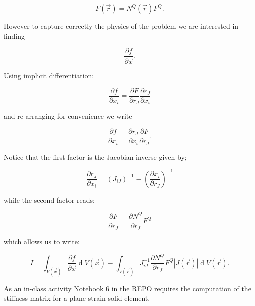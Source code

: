 \[F(\overrightarrow r)=N^Q(\overrightarrow r)F^Q.\]

However to capture correctly the physics of the problem we are interested in finding

\[\frac{\partial f}{\partial\overrightarrow x}.\]

Using implicit differentiation:

\[\frac{\partial f}{\partial x_i}=\frac{\partial F}{\partial r_J}\frac{\partial r_J}{\partial x_i}\]

and re-arranging for convenience we write

\begin{equation}
\frac{\partial f}{\partial x_i}=\frac{\displaystyle\partial r_J}{\displaystyle\partial x_i}\frac{\partial F}{\partial r_J}.
\end{equation}

Notice that the first factor is the Jacobian inverse given by;

\[\frac{\partial r_J}{\partial x_i}=\left(J_{iJ}\right)^{-1}\equiv\left(\frac{\displaystyle\partial x_i}{\displaystyle\partial r_J}\right)^{-1}\]

while the second factor reads:

\[\frac{\partial F}{\partial r_J}=\frac{\partial N^Q}{\partial r_J}F^Q\]

which allows us to write:

\[I=\int_{V(\overrightarrow x)}\frac{\partial f}{\partial\overrightarrow x}\operatorname d{V(\overrightarrow x)}\equiv\int_{V(\overrightarrow r)}J_{iJ}^{-1}\frac{\displaystyle\partial N^Q}{\displaystyle\partial r_J} F^Q \left|J(\overrightarrow r)\right|\operatorname dV(\overrightarrow r).\]


\begin{tcolorbox}
As an in-class activity Notebook 6 in the REPO requires the computation of the stiffness matrix for a plane strain solid element.
\end{tcolorbox}

